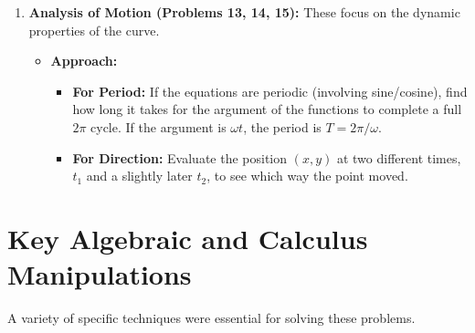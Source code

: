 \documentclass{article}
\begin{document}
\begin{enumerate}
    \item \textbf{Analysis of Motion (Problems 13, 14, 15):} These focus on the dynamic properties of the curve.
        \begin{itemize}
            \item \textbf{Approach:}
            \begin{itemize}
                \item \textbf{For Period:} If the equations are periodic (involving sine/cosine), find how long it takes for the argument of the functions to complete a full $2\pi$ cycle. If the argument is $\omega t$, the period is $T = 2\pi/\omega$.
                \item \textbf{For Direction:} Evaluate the position $(x, y)$ at two different times, $t_1$ and a slightly later $t_2$, to see which way the point moved.
            \end{itemize}
        \end{itemize}
\end{enumerate}

\section{Key Algebraic and Calculus Manipulations}

A variety of specific techniques were essential for solving these problems.
\end{document}
